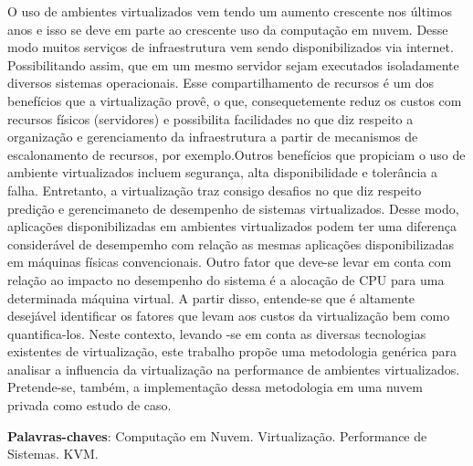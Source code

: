 \begin{resumo}
 O uso de ambientes virtualizados vem tendo um aumento crescente nos últimos anos e isso
se deve em parte ao crescente uso da computação em nuvem. Desse modo muitos serviços de infraestrutura vem sendo disponibilizados via internet. Possibilitando assim, que em um mesmo servidor sejam executados isoladamente diversos sistemas operacionais. Esse compartilhamento de recursos é um dos benefícios que a virtualização provê, o que, consequetemente reduz os custos com recursos físicos (servidores) e possibilita facilidades no que diz respeito a organização e gerenciamento da infraestrutura a partir de mecanismos de escalonamento de recursos, por exemplo.Outros benefícios que propiciam o uso de ambiente virtualizados incluem segurança, alta disponibilidade e tolerância a falha. Entretanto, a virtualização traz consigo desafios no que diz respeito predição e gerencimaneto de desempenho de sistemas virtualizados. Desse modo, aplicações disponibilizadas em ambientes virtualizados podem ter uma diferença considerável de desempemho com relação as mesmas aplicações disponibilizadas em máquinas físicas convencionais. Outro fator que deve-se levar em conta com relação ao impacto no desempenho do sistema é a alocação de CPU para uma determinada máquina virtual. A partir disso, entende-se que é altamente desejável identificar os fatores que levam aos custos da virtualização bem como quantifica-los. Neste contexto, levando -se em conta as diversas tecnologias existentes de virtualização, este trabalho propõe uma metodologia genérica para analisar a influencia da virtualização na performance de ambientes virtualizados. Pretende-se, também, a implementação dessa metodologia em uma nuvem privada como estudo de caso.

 \vspace{\onelineskip}
    
 \noindent
 \textbf{Palavras-chaves}: Computação em Nuvem. Virtualização. Performance de Sistemas. KVM.
\end{resumo}
